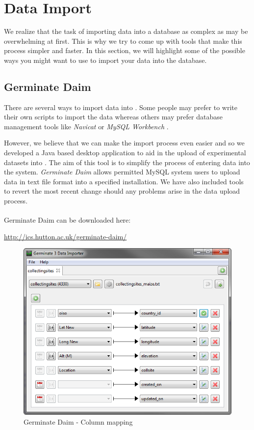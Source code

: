 \section{Data Import}
\label{sec:dataimport}
We realize that the task of importing data into a database as complex as {\germinate} may be overwhelming at first. This is why we try to come up with tools that make this process simpler and faster. In this section, we will highlight some of the possible ways you might want to use to import your data into the {\germinate} database.

\subsection{Germinate Daim}
There are several ways to import data into {\germinate}. Some people may prefer to write their own scripts to import the data whereas others may prefer database management tools like \textit{Navicat} \cite{Navicat} or \textit{MySQL Workbench} \cite{MySQLWorkbench}.

However, we believe that we can make the import process even easier and so we developed a Java based desktop application to aid in the upload of experimental datasets into {\germinate}. The aim of this tool is to simplify the process of entering data into the system. \textit{Germinate Daim} allows permitted MySQL system users to upload data in text file format into a specified {\germinate} installation. We have also included tools to revert the most recent change should any problems arise in the data upload process.\\
\\
 Germinate Daim can be downloaded here:

\begin{center}
    \url{http://ics.hutton.ac.uk/germinate-daim/}
\end{center}

\begin{figure}
    \centering
    \includegraphics[scale=0.6]{img/import/g3di-mapping.png}
    \caption{Germinate Daim - Column mapping}
    \label{fig:g3di-mapping}
\end{figure}

